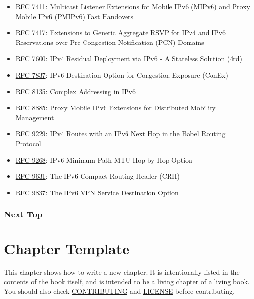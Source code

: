\documentclass[
]{article}
\begin{document}
\begin{itemize}
  Multicast Sender Support in Proxy Mobile IPv6 (PMIPv6) Domains
\item
  \href{https://www.rfc-editor.org/info/rfc7411}{RFC 7411}: Multicast
  Listener Extensions for Mobile IPv6 (MIPv6) and Proxy Mobile IPv6
  (PMIPv6) Fast Handovers
\item
  \href{https://www.rfc-editor.org/info/rfc7417}{RFC 7417}: Extensions
  to Generic Aggregate RSVP for IPv4 and IPv6 Reservations over
  Pre-Congestion Notification (PCN) Domains
\item
  \href{https://www.rfc-editor.org/info/rfc7600}{RFC 7600}: IPv4
  Residual Deployment via IPv6 - A Stateless Solution (4rd)
\item
  \href{https://www.rfc-editor.org/info/rfc7837}{RFC 7837}: IPv6
  Destination Option for Congestion Exposure (ConEx)
\item
  \href{https://www.rfc-editor.org/info/rfc8135}{RFC 8135}: Complex
  Addressing in IPv6
\item
  \href{https://www.rfc-editor.org/info/rfc8885}{RFC 8885}: Proxy Mobile
  IPv6 Extensions for Distributed Mobility Management
\item
  \href{https://www.rfc-editor.org/info/rfc9229}{RFC 9229}: IPv4 Routes
  with an IPv6 Next Hop in the Babel Routing Protocol
\item
  \href{https://www.rfc-editor.org/info/rfc9268}{RFC 9268}: IPv6 Minimum
  Path MTU Hop-by-Hop Option
\item
  \href{https://www.rfc-editor.org/info/rfc9631}{RFC 9631}: The IPv6
  Compact Routing Header (CRH)
\item
  \href{https://www.rfc-editor.org/info/rfc9837}{RFC 9837}: The IPv6 VPN
  Service Destination Option
\end{itemize}

\subsubsection{\texorpdfstring{\hyperref[chapter-template]{Next}
\hyperref[further-reading]{Top}}{Next Top}}\label{next-top-9}

\pagebreak

\section{Chapter Template}\label{chapter-template}

This chapter shows how to write a new chapter. It is intentionally
listed in the contents of the book itself, and is intended to be a
living chapter of a living book. You should also check
\href{https://github.com/becarpenter/book6/blob/main/CONTRIBUTING.md}{CONTRIBUTING}
and
\href{https://github.com/becarpenter/book6/blob/main/LICENSE.md}{LICENSE}
before contributing.
\end{document}
